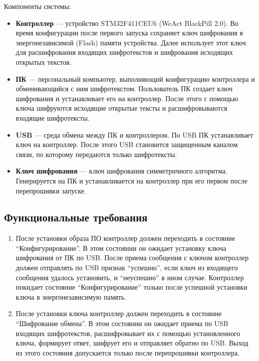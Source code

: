 \documentclass[14pt]{extarticle}
\begin{document}
Компоненты системы:

\begin{itemize}

 \item \textbf{Контроллер} --- устройство STM32F411CEU6 (WeAct BlackPill 2.0).
  Во время конфигурации после первого запуска сохраняет ключ шифрования в
  энергонезависимой (Flash) памяти устройства.
  Далее использует этот ключ для расшифрования входящих шифротекстов и шифрования
  исходящих открытых текстов.

 \item \textbf{ПК} --- персональный компьютер, выполняющий конфигурацию контроллера
  и обменивающийся с ним шифротекстом.
  Пользователь ПК создает ключ шифрования и устанавливает его на контроллер.
  После этого с помощью ключа шифруются исходящие открытые тексты и расшифровываются
  входящие шифротексты.

 \item \textbf{USB} --- среда обмена между ПК и контроллером.
  По USB ПК устанавливает ключ на контроллер.
  После этого USB становится защищенным каналом связи, по которому передаются
  только шифротексты.

 \item \textbf{Ключ шифрования} --- ключ шифрования симметричного алгоритма.
  Генерируется на ПК и устанавливается на контроллер при его первом после
  перепрошивки запуске.

\end{itemize}

\subsection{Функциональные требования}

\begin{enumerate}

 \item После установки образа ПО контроллер должен переходить в состояние
  ``Конфигурирование''.
  В этом состоянии он ожидает установку ключа шифрования от ПК по USB.
  После приема сообщения с ключом контроллер должен отправлять по USB признак
  ``успешно'', если ключ из входящего сообщения удалось установить, и
  ``неуспешно'' в ином случае.
  Контроллер покидает состояние ``Конфигурирование'' только после успешной
  установки ключа в энергонезависимую память.

 \item После установки ключа контроллер должен переходить в состояние
  ``Шифрование обмена''.
  В этом состоянии он ожидает приема по USB входящих шифротекстов, расшифровывает
  их с помощью установленного ключа, формирует ответ, шифрует его и отправляет
  обратно по USB.
  Выход из этого состояния допускается только после перепрошивки контроллера.

\end{enumerate}
\end{document}
